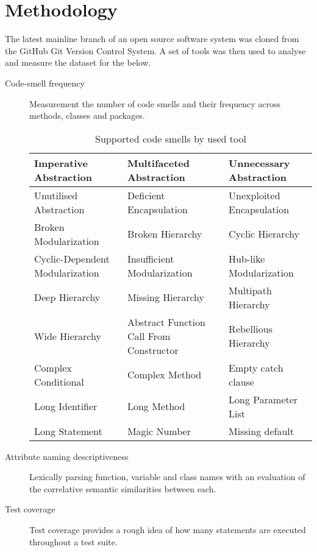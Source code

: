 \section{Methodology}

The latest mainline branch of an open source software system was cloned from the GitHub Git Version Control System. A set of tools was then used to analyse and measure the dataset for the below.

\begin{description}
	\item [Code-smell frequency] 
	
	Measurement the number of code smells and their frequency across methods, classes and packages.
	
	\begin{table}[H]
		\begin{tabular}{ | l | l | l |}
			\hline
			Imperative Abstraction & Multifaceted Abstraction & Unnecessary Abstraction \\
			\hline
			Unutilised Abstraction & Deficient Encapsulation & Unexploited Encapsulation \\
			\hline
			Broken Modularization & Broken Hierarchy & Cyclic Hierarchy \\
			\hline
			Cyclic-Dependent Modularization & Insufficient Modularization & Hub-like Modularization \\
			\hline
			Deep Hierarchy & Missing Hierarchy & Multipath Hierarchy \\ 
			\hline
			Wide Hierarchy & Abstract Function Call From Constructor & Rebellious Hierarchy \\
			\hline
			Complex Conditional & Complex Method & Empty catch clause \\
			\hline
			Long Identifier & Long Method & Long Parameter List \\
			\hline
			Long Statement & Magic Number & Missing default \\
			\hline
		\end{tabular}
		\caption{Supported code smells by used tool}
		\label{tab:supportedCodeSmells}
	\end{table}
	
	\item [Attribute naming descriptiveness]
	
	Lexically parsing function, variable and class names with an evaluation of the correlative semantic similarities between each.
	
	\item [Test coverage] Test coverage provides a rough idea of how many statements are executed throughout a test suite. 
	

\end{description}
